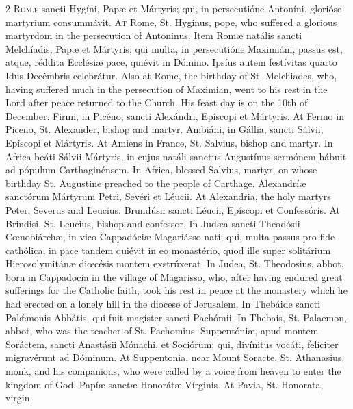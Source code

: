 \begin{paracol}{2}
\lettrine[lines=2]{R}{omæ} sancti Hygíni, Papæ et Mártyris; qui, in 
 persecutióne Antoníni, glorióse martyrium consummávit.
\switchcolumn
{}
\lettrine[lines=2]{A}{t} Rome, St. Hyginus, pope, who suffered a glorious martyrdom in the 
 persecution of Antoninus.
\switchcolumn*
{}
Item Romæ natális sancti Melchíadis, Papæ et 
 Mártyris; qui multa, in persecutióne Maximiáni, passus est, atque, réddita 
 Ecclésiæ pace, quiévit in Dómino. Ipsíus autem festívitas quarto Idus 
 Decémbris celebrátur.
\switchcolumn
{}
Also at Rome, the birthday of St. Melchiades, who, having suffered much in 
 the persecution of Maximian, went to his rest in the Lord after peace 
 returned to the Church. His feast day is on the 10th of December.
\switchcolumn*
{}
Firmi, in Picéno, sancti Alexándri, Epíscopi et Mártyris.
\switchcolumn
{}
At Fermo in Piceno, St. Alexander, bishop and martyr.
\switchcolumn*
{}
Ambiáni, in Gállia, sancti Sálvii, Epíscopi et Mártyris.
\switchcolumn
{}
At Amiens in France, St. Salvius, bishop and martyr.
\switchcolumn*
{}
In Africa beáti Sálvii Mártyris, in cujus natáli sanctus Augustínus sermónem 
 hábuit ad pópulum Carthaginénsem.
\switchcolumn
{}
In Africa, blessed Salvius, martyr, on whose birthday St. Augustine preached 
 to the people of Carthage.
\switchcolumn*
{}
Alexandríæ sanctórum Mártyrum Petri, Sevéri et 
 Léucii.
\switchcolumn
{}
At Alexandria, the holy martyrs Peter, Severus and Leucius.
\switchcolumn*
{}
Brundúsii sancti Léucii, Epíscopi et 
 Confessóris.
\switchcolumn
{}
At Brindisi, St. Leucius, bishop and confessor.
\switchcolumn*
{}
In Judæa sancti Theodósii Cœnobiárchæ, in vico 
Cappadóciæ Magariásso nati; qui, multa passus pro fide cathólica, in pace 
tandem quiévit in eo monastério, quod ille super solitárium Hierosolymitánæ 
diœcésis montem exstrúxerat.
\switchcolumn
{}
In Judea, St. Theodosius, abbot, born in Cappadocia in the village of 
 Magarisso, who, after having endured great sufferings for the Catholic 
 faith, took his rest in peace at the monastery which he had erected on a 
 lonely hill in the diocese of Jerusalem.
\switchcolumn*
{}
In Thebáide sancti Palǽmonis Abbátis, qui fuit 
 magíster sancti Pachómii.
\switchcolumn
{}
In Thebais, St. Palaemon, abbot, who was the teacher of St. Pachomius.
\switchcolumn*
{}
Suppentóniæ, apud montem Soráctem, sancti 
 Anastásii Mónachi, et Sociórum; qui, divínitus vocáti, felíciter migravérunt 
 ad Dóminum.
\switchcolumn
{}
At Suppentonia, near Mount Soracte, St. Athanasius, monk, and his 
 companions, who were called by a voice from heaven to enter the kingdom of 
 God.
\switchcolumn*
{}
Papíæ sanctæ Honorátæ Vírginis.
\switchcolumn
{}
At Pavia, St. Honorata, virgin.
\switchcolumn*
{}
\end{paracol}


